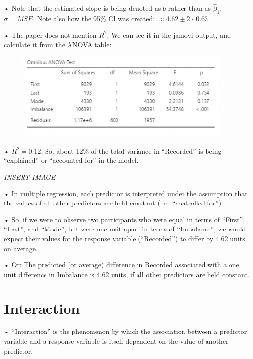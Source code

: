 \documentclass[
  letterpaper,
  DIV=11,
  numbers=noendperiod]{scrreprt}
\begin{document}
• Note that the estimated slope is being denoted as \(b\) rather than as
\(\hat{\beta}_1\). \(\hat{\sigma} = MSE\). Note also how the 95\% CI was
created: \(\approx 4.62 ± 2 ∗ 0.63\)

• The paper does not mention \(R^2\). We can see it in the jamovi
output, and calculate it from the ANOVA table:

\begin{figure}

{\centering \includegraphics[width=4.16667in,height=\textheight]{images/Mod2_pt1_11.png}

}

\end{figure}

• \(R^2 = 0.12\). So, about 12\% of the total variance in ``Recorded''
is being ``explained'' or ``accounted for'' in the model.

\emph{INSERT IMAGE}

• In multiple regression, each predictor is interpreted under the
assumption that the values of all other predictors are held constant
(i.e.~``controlled for'').

• So, if we were to observe two participants who were equal in terms of
``First'', ``Last'', and ``Mode'', but were one unit apart in terms of
``Imbalance'', we would expect their values for the response variable
(``Recorded'') to differ by 4.62 units on average.

• Or: The predicted (or average) difference in Recorded associated with
a one unit difference in Imbalance is 4.62 units, if all other
predictors are held constant.

\hypertarget{interaction}{%
\section{Interaction}\label{interaction}}

• ``Interaction'' is the phenomenon by which the association between a
predictor variable and a response variable is itself dependent on the
value of another predictor.
\end{document}
